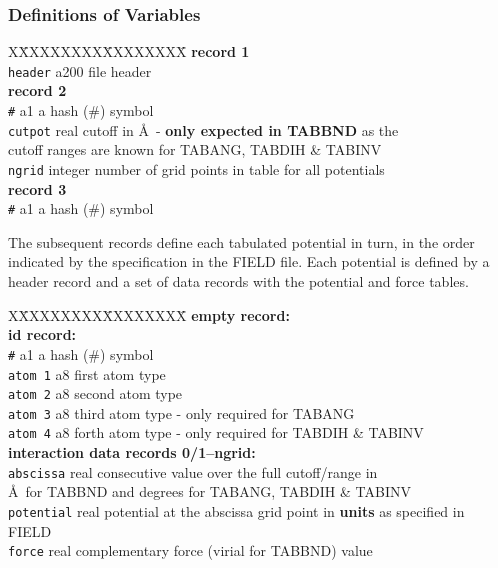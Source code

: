 \subsubsection{Definitions of Variables}

\begin{tabbing}
X\=XXXXXXXX\=XXXXXXXX\=\kill
{\bf record 1} \\
\> {\tt header}    \> a200    \> file header \\
{\bf record 2} \\
\> {\tt \#}        \> a1      \> a hash (\#) symbol \\
\> {\tt cutpot}    \> real    \> cutoff in \AA~- {\bf only expected in TABBND} as the \\
\>                 \>         \> cutoff ranges are known for TABANG, TABDIH \& TABINV \\
\> {\tt ngrid}     \> integer \> number of grid points in table for all potentials \\
{\bf record 3} \\
\> {\tt \#}        \> a1      \> a hash (\#) symbol
\end{tabbing}

The subsequent records define each tabulated potential in turn,
{in the order indicated by the specification in the FIELD file}.
Each potential is defined by a header record and a set of data
records with the potential and force tables.

\begin{tabbing}
X\=XXXXXXXX\=XXXXXXXX\=\kill
{\bf empty record:} \\
{\bf id record:} \\
\> {\tt \#}        \> a1   \> a hash (\#) symbol \\
\> {\tt atom 1}    \> a8   \> first atom type \\
\> {\tt atom 2}    \> a8   \> second atom type \\
\> {\tt atom 3}    \> a8   \> third atom type - only required for TABANG \\
\> {\tt atom 4}    \> a8   \> forth atom type - only required for TABDIH \& TABINV \\
{\bf interaction data records 0/1--ngrid:} \\
\> {\tt abscissa}  \> real \> consecutive value over the full cutoff/range in \\
\>                 \>      \> \AA~for TABBND and degrees for TABANG, TABDIH \& TABINV \\
\> {\tt potential} \> real \> potential at the abscissa grid point in {\bf units} as specified in FIELD \\
\> {\tt force}     \> real \> complementary force (virial for TABBND) value
\end{tabbing}

